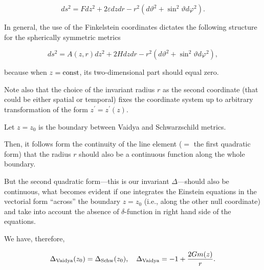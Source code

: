 \begin{equation}

\label{Schwfink}

ds^2 = F dz^2 + 2 \varepsilon dz dr - r^2 (d \vartheta^2 + \sin^2{\vartheta} d \varphi^2).

\end{equation}

In general, the use of the Finkelstein coordinates dictates the following structure for the spherically symmetric metrics

\begin{equation}

\label{genfink}

ds^2 = A(z,r) dz^2 + 2 H dz dr - r^2 (d \vartheta^2 + \sin^2{\vartheta} d \varphi^2),

\end{equation}

because when $z = \rm const$, its two-dimensional part should equal zero. 

Note also that the choice of the invariant radius $r$ as the second coordinate (that could be either spatial or temporal) fixes the coordinate system up to arbitrary transformation of the form $z^{\prime} = z^{\prime}(z)$. 

Let $z = z_0$  is the boundary between Vaidya and Schwarzschild metrics. 

Then, it follows form the continuity of the line element ($=$ the first quadratic form) that the radius $r$ should also be a continuous function along the whole boundary. 

But the second quadratic form---this is our invariant $\Delta$---should also be continuous, what becomes evident if one integrates the Einstein equations in the vectorial form ``across'' the boundary $z = z_0$ (i.e., along the other null coordinate) and take into account the absence of $\delta$-function in right hand side of the equations. 

We have, therefore,

\begin{gather}

\label{SW}

\Delta_{\rm Vaidya} (z_0) = \Delta_{\rm Schw} (z_0),

\quad %


\Delta_{\rm Vaidya} = - 1 + \frac{2 G m(z)}{r}.

\end{gather}

